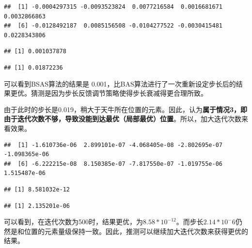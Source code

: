 \documentclass[]{ctexbook}
\newenvironment{Shaded}{\begin{snugshade}}{\end{snugshade}}
\newcommand{\KeywordTok}[1]{\textcolor[rgb]{0.13,0.29,0.53}{\textbf{#1}}}
\newcommand{\DataTypeTok}[1]{\textcolor[rgb]{0.13,0.29,0.53}{#1}}
\newcommand{\DecValTok}[1]{\textcolor[rgb]{0.00,0.00,0.81}{#1}}
\newcommand{\StringTok}[1]{\textcolor[rgb]{0.31,0.60,0.02}{#1}}
\newcommand{\OperatorTok}[1]{\textcolor[rgb]{0.81,0.36,0.00}{\textbf{#1}}}
\newcommand{\NormalTok}[1]{#1}
\begin{document}
\begin{verbatim}
##  [1] -0.0004297315 -0.0093523824  0.0077216584  0.0016681671  0.0032866863
##  [6] -0.0128492187  0.0085156508 -0.0104277522 -0.0030415481  0.0228343806
\end{verbatim}

\begin{verbatim}
## [1] 0.001037878
\end{verbatim}

\begin{verbatim}
## [1] 0.01872236
\end{verbatim}

可以看到BSAS算法的结果是
0.001，比BAS算法进行了一次重新设定步长后的结果更优。猜测是因为步长反馈调节策略使得步长衰减得更合理所致。

由于此时的步长是0.019，稍大于天牛所在位置的元素。因此，认为\textbf{属于情况3，即由于迭代次数不够，导致没能到达最优（局部最优）位置}。所以，加大迭代次数来看效果。

\begin{Shaded}
\end{Shaded}

\begin{verbatim}
##  [1] -1.610736e-06  2.899101e-07 -4.068405e-08 -2.802695e-07 -1.098365e-06
##  [6] -6.222215e-08  8.150385e-07 -7.817550e-07 -1.019755e-06  1.515487e-06
\end{verbatim}

\begin{verbatim}
## [1] 8.581032e-12
\end{verbatim}

\begin{verbatim}
## [1] 2.135201e-06
\end{verbatim}

可以看到，在迭代次数为500时，结果更优，为\(8.58*10^{-12}\)。而步长\(2.14*10^-6\)仍然是和位置的元素量级保持一致。因此，推测可以继续加大迭代次数来获得更优的结果。

\begin{Shaded}
\end{Shaded}
\end{document}
